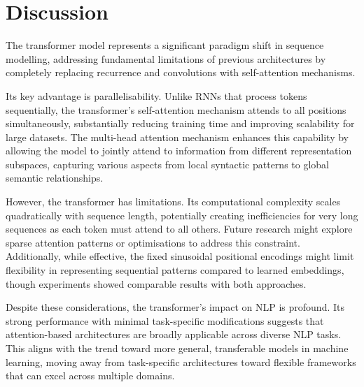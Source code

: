 \section{Discussion}

The transformer model represents a significant paradigm shift in sequence modelling, addressing fundamental limitations of previous architectures by completely replacing recurrence and convolutions with self-attention mechanisms.

Its key advantage is parallelisability. Unlike RNNs that process tokens sequentially, the transformer's self-attention mechanism attends to all positions simultaneously, substantially reducing training time and improving scalability for large datasets. The multi-head attention mechanism enhances this capability by allowing the model to jointly attend to information from different representation subspaces, capturing various aspects from local syntactic patterns to global semantic relationships.

However, the transformer has limitations. Its computational complexity scales quadratically with sequence length, potentially creating inefficiencies for very long sequences as each token must attend to all others. Future research might explore sparse attention patterns or optimisations to address this constraint. Additionally, while effective, the fixed sinusoidal positional encodings might limit flexibility in representing sequential patterns compared to learned embeddings, though experiments showed comparable results with both approaches.

Despite these considerations, the transformer's impact on NLP is profound. Its strong performance with minimal task-specific modifications suggests that attention-based architectures are broadly applicable across diverse NLP tasks. This aligns with the trend toward more general, transferable models in machine learning, moving away from task-specific architectures toward flexible frameworks that can excel across multiple domains.
